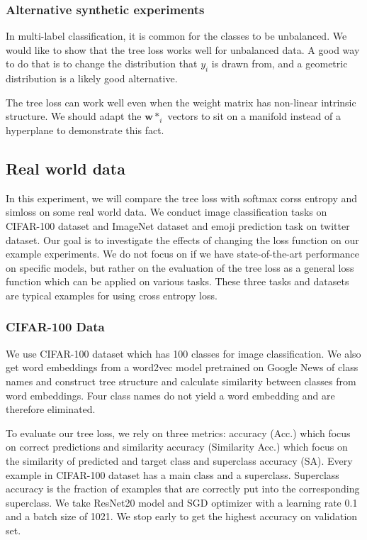 \documentclass[twoside]{article}
\theoremstyle{definition}
\newcommand{\w}{\mathbf w}
\newcommand{\fixme}[1]{\noindent{\color{red}\textbf{FIXME:}  {#1}}}
\begin{document}
\subsubsection{Alternative synthetic experiments}

In multi-label classification, it is common for the classes to be unbalanced.
We would like to show that the tree loss works well for unbalanced data.
A good way to do that is to change the distribution that $y_i$ is drawn from,
and a geometric distribution is a likely good alternative.

The tree loss can work well even when the weight matrix has non-linear intrinsic structure.
We should adapt the $\w*_i$ vectors to sit on a manifold instead of a hyperplane to demonstrate this fact.


\subsection{Real world data}
In this experiment, we will compare the tree loss with softmax corss entropy and simloss on some real world data.
We conduct image classification tasks on CIFAR-100 dataset and ImageNet dataset and emoji prediction task on twitter dataset.
Our goal is to investigate the effects of changing the loss function on our example experiments.
We do not focus on if we have state-of-the-art performance on specific models, but rather on the evaluation of the tree loss as a general loss function which can be applied on various tasks.
These three tasks and datasets are typical examples for using cross entropy loss.

\subsubsection{CIFAR-100 Data}
We use CIFAR-100 dataset which has 100 classes for image classification.
We also get word embeddings from a word2vec model pretrained on Google News \cite{Mikolov2013EfficientEO} of class names and construct tree structure and calculate similarity between classes from word embeddings.
Four class names do not yield a word embedding and are therefore eliminated.

To evaluate our tree loss, we rely on three metrics: accuracy (Acc.) which focus on correct predictions and similarity accuracy (Similarity Acc.) which focus on the similarity of predicted and target class and superclass accuracy (SA). Every example in CIFAR-100 dataset has a main class and a superclass. Superclass accuracy is the fraction of examples that are correctly put into the corresponding superclass.
We take ResNet20 model \cite{He2016DeepRL} and SGD optimizer with a learning rate 0.1 and a batch size of 1021. 
We stop early to get the highest accuracy on validation set.
\end{document}
